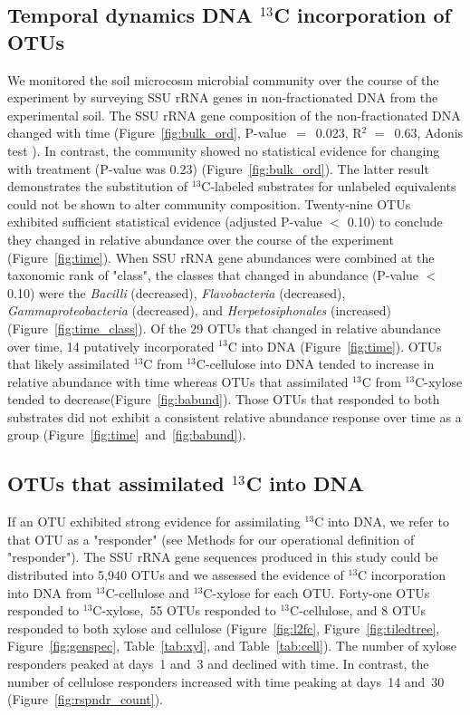 \subsection{Temporal dynamics DNA $^{13}$C incorporation of OTUs}
We monitored the soil microcosm microbial community over the course of the
experiment by surveying SSU rRNA genes in non-fractionated DNA from the
experimental soil. The SSU rRNA gene composition of the non-fractionated DNA
changed with time (Figure~\ref{fig:bulk_ord}, P-value~$=$~0.023, R$^{2}$
$=$~0.63, Adonis test \citep{Anderson2001a}). In contrast, the community showed
no statistical evidence for changing with treatment (P-value was 0.23)
(Figure~\ref{fig:bulk_ord}). The latter result demonstrates the substitution of
$^{13}$C-labeled substrates for unlabeled equivalents could not be shown to
alter community composition. Twenty-nine OTUs exhibited sufficient statistical
evidence (adjusted P-value $<$ 0.10) to conclude they changed in relative
abundance over the course of the experiment (Figure~\ref{fig:time}). When SSU
rRNA gene abundances were combined at the taxonomic rank of "class", the
classes that changed in abundance (P-value $<$
  0.10) were the \textit{Bacilli} (decreased), \textit{Flavobacteria}
  (decreased), \textit{Gammaproteobacteria} (decreased), and
  \textit{Herpetosiphonales} (increased) (Figure~\ref{fig:time_class}). Of the
  29 OTUs that changed in relative abundance over time, 14 putatively
  incorporated $^{13}$C into DNA (Figure~\ref{fig:time}). OTUs that likely
  assimilated $^{13}$C from $^{13}$C-cellulose into DNA tended to increase in
  relative abundance with time whereas OTUs that assimilated $^{13}$C from
  $^{13}$C-xylose tended to decrease(Figure~\ref{fig:babund}). Those OTUs that
  responded to both substrates did not exhibit a consistent relative abundance
  response over time as a group (Figure~\ref{fig:time}~and~\ref{fig:babund}).

\subsection{OTUs that assimilated $^{13}$C into DNA} \label{responders}
If an OTU exhibited strong evidence for assimilating $^{13}$C into DNA, we
refer to that OTU as a "responder" (see Methods for our
operational definition of "responder"). The SSU rRNA gene sequences produced in
this study could be distributed into 5,940 OTUs and we assessed the evidence of
$^{13}$C incorporation into DNA from $^{13}$C-cellulose and $^{13}$C-xylose for
each OTU. Forty-one OTUs responded to $^{13}$C-xylose,~55 OTUs responded to
$^{13}$C-cellulose, and 8 OTUs responded to both xylose and cellulose
(Figure~\ref{fig:l2fc}, Figure~\ref{fig:tiledtree}, Figure~\ref{fig:genspec},
Table~\ref{tab:xyl}, and Table~\ref{tab:cell}). The number of xylose responders
peaked at days~1 and~3 and declined with time. In contrast, the number of
cellulose responders increased with time peaking at days~14 and~30
(Figure~\ref{fig:rspndr_count}). 

